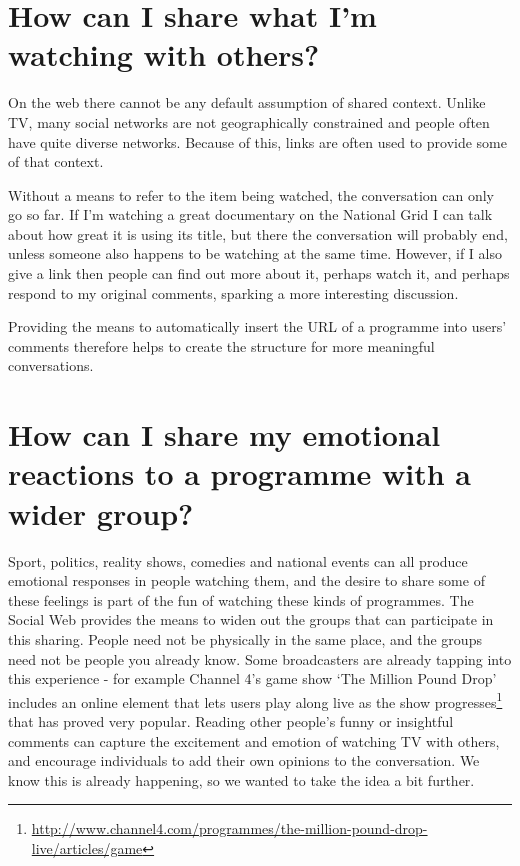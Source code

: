 \documentclass{notube}
\begin{document}
\section{How can I share what I'm watching with others?}

On the web there cannot be any default assumption of shared context. Unlike TV, many social networks are not geographically constrained and people often have quite diverse networks. Because of this, links are often used to provide some of that context. 

Without a means to refer to the item being watched, the conversation can only go so far. If I'm watching a great documentary on the National Grid I can talk about how great it is using its title, but there the conversation will probably end, unless someone also happens to be watching at the same time. However, if I also give a link then people can find out more about it, perhaps watch it, and perhaps respond to my original comments, sparking a more interesting discussion. 

Providing the means to automatically insert the URL of a programme into users' comments therefore helps to create the structure for more meaningful conversations.

\section{How can I share my emotional reactions to a programme with a wider group?}

Sport, politics, reality shows, comedies and national events can all produce emotional responses in people watching them, and the desire to share some of these feelings is part of the fun of watching these kinds of programmes. The Social Web provides the means to widen out the groups that can participate in this sharing. People need not be physically in the same place, and the groups need not be people you already know. Some broadcasters are already tapping into this experience  - for example Channel 4's game show `The Million Pound Drop' includes an online element that lets users play along live as the show progresses\footnote{\url{http://www.channel4.com/programmes/the-million-pound-drop-live/articles/game}}  that has proved very popular. Reading other people's funny or insightful comments can capture the excitement and emotion of watching TV with others, and encourage individuals to add their own opinions to the conversation. We know this is already happening, so we wanted to take the idea a bit further.
\end{document}
